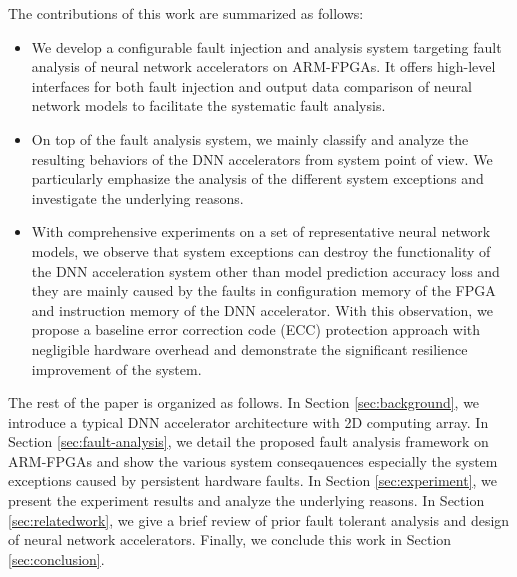 The contributions of this work are summarized as follows: 
\begin{itemize}
  \item We develop a configurable fault injection and analysis system 
    targeting fault analysis of neural network accelerators on ARM-FPGAs. 
    It offers high-level interfaces for both fault injection and 
    output data comparison of neural network models to facilitate 
    the systematic fault analysis.

  \item On top of the fault analysis system, we mainly classify 
    and analyze the resulting behaviors of the DNN accelerators 
    from system point of view. We particularly emphasize the 
    analysis of the different system exceptions and investigate the 
    underlying reasons.

  \item With comprehensive experiments on a set of representative 
    neural network models, we observe that system exceptions can 
    destroy the functionality of the DNN acceleration system 
    other than model prediction accuracy loss and they are mainly 
    caused by the faults in configuration memory 
    of the FPGA and instruction memory of the DNN accelerator. 
    With this observation, we propose a baseline error 
    correction code (ECC) protection approach with negligible 
    hardware overhead and demonstrate the significant 
    resilience improvement of the system.
\end{itemize}

The rest of the paper is organized as follows. In Section \ref{sec:background}, 
we introduce a typical DNN accelerator architecture with 2D computing array. 
In Section \ref{sec:fault-analysis}, 
we detail the proposed fault analysis framework on ARM-FPGAs and show the 
various system conseqauences especially the system exceptions caused by 
persistent hardware faults. In Section \ref{sec:experiment}, we present the 
experiment results and analyze the underlying reasons. In Section \ref{sec:relatedwork}, 
we give a brief review of prior fault tolerant analysis and design of neural network accelerators.
Finally, we conclude this work in Section \ref{sec:conclusion}.


